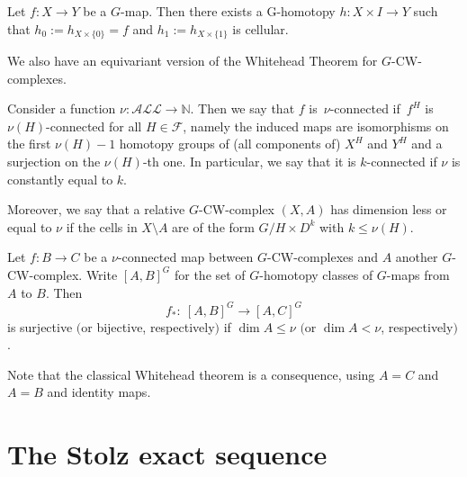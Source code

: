 \begin{Theorem} \label{cellular}
	Let $f\colon X\to Y$ be a $G$-map. Then there exists a G-homotopy $h\colon X\times I\to Y$ such that $h_0:= h_{X\times\{0\}}=f$ and $h_1:= h_{X\times\{1\}}$ is cellular.
\end{Theorem}

We also have an equivariant version of the Whitehead Theorem for $G$-CW-complexes.

\begin{Definition}\label{def:connectedness}
	Consider a function $\nu\colon \mathcal{ALL}\to\mathbb{N}$. Then we say that
	$f$ is~$\nu$-connected if~$f^H$ is~$\nu(H)$-connected for all $H\in
	\mathcal{F}$, namely the induced maps are isomorphisms on the first
	$\nu(H)-1$ homotopy groups of (all components of) $X^H$ and $Y^H$ and a
	surjection on the $\nu(H)$-th one.
	In particular, we say that it is {$k$-connected} if $\nu$ is constantly equal to $k$.
	
	Moreover, we say that a relative $G$-CW-complex $(X,A)$ has dimension less or equal to $\nu$ if the cells in $X\setminus A$ are of the form $G/H\times D^k$ with $k\leq\nu(H)$.
\end{Definition}
\begin{Proposition} \label{whitehead}
	Let $f\colon B\to C$ be a $\nu$-connected map between $G$-CW-complexes and $A$
	another
	$G$-CW-complex. Write $[A,B]^G$ for the set of $G$-homotopy classes of
	$G$-maps from $A$ to $B$. Then
	\begin{equation*}
		f_*\colon\ [A,B]^G\to [A,C]^G
	\end{equation*}
	is surjective $($or
	bijective, respectively$)$ if $\dim A\leq\nu$ $($or $\dim A<\nu$, respectively$)$.
\end{Proposition}

Note that the classical Whitehead theorem is a consequence, using $A=C$
and $A=B$ and identity maps.

\section{The Stolz exact sequence}
	
